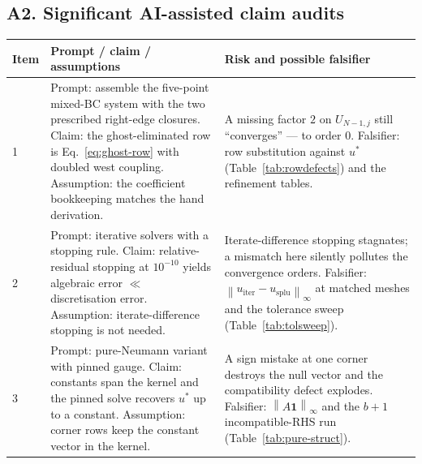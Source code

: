 \documentclass[11pt,a4paper]{article}
\newcommand{\vect}[1]{\mathbf{#1}}
\newcommand{\norm}[1]{\left\lVert #1 \right\rVert}
\begin{document}
\subsection*{A2. Significant AI-assisted claim audits}
\begin{table}[h]
\centering
\small
\begin{tabular}{@{}p{0.8cm}p{5.7cm}p{5.0cm}@{}}
\toprule
Item & Prompt / claim / assumptions & Risk and possible falsifier \\
\midrule
1 &
Prompt: assemble the five-point mixed-BC system with the two prescribed
right-edge closures.  Claim: the ghost-eliminated row is
Eq.~\eqref{eq:ghost-row} with doubled west coupling.  Assumption: the
coefficient bookkeeping matches the hand derivation. &
A missing factor $2$ on $U_{N-1,j}$ still ``converges'' --- to order $0$.
Falsifier: row substitution against $u^*$ (Table~\ref{tab:rowdefects}) and
the refinement tables. \\
2 &
Prompt: iterative solvers with a stopping rule.  Claim:
relative-residual stopping at $10^{-10}$ yields algebraic error $\ll$
discretisation error.  Assumption: iterate-difference stopping is not
needed. &
Iterate-difference stopping stagnates; a mismatch here silently pollutes
the convergence orders.  Falsifier:
$\norm{u_{\mathrm{iter}} - u_{\mathrm{splu}}}_\infty$ at matched meshes
and the tolerance sweep (Table~\ref{tab:tolsweep}). \\
3 &
Prompt: pure-Neumann variant with pinned gauge.  Claim: constants span
the kernel and the pinned solve recovers $u^*$ up to a constant.
Assumption: corner rows keep the constant vector in the kernel. &
A sign mistake at one corner destroys the null vector and the
compatibility defect explodes.  Falsifier: $\norm{A\vect{1}}_\infty$
and the $b+1$ incompatible-RHS run (Table~\ref{tab:pure-struct}). \\
\bottomrule
\end{tabular}
\end{table}
\end{document}
